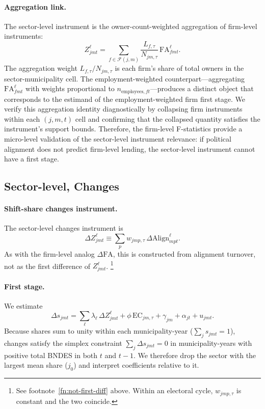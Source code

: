 \documentclass{article}
\newcommand{\Align}{\mathrm{Align}}
\newcommand{\FA}{\mathrm{FA}}
\newcommand{\EC}{\mathrm{EC}}
\begin{document}
\paragraph{Aggregation link.}
The sector-level instrument is the owner-count-weighted aggregation of firm-level instruments:
\[
  Z^{\ell}_{jmt}
  = \sum_{f\in\mathcal{F}(j,m)} \frac{L_{f,\tau}}{N_{jm,\tau}}\,\FA^{\ell}_{fmt}.
\]
The aggregation weight $L_{f,\tau}/N_{jm,\tau}$ is each firm's share of total owners
in the sector-municipality cell.
The employment-weighted counterpart---aggregating $\FA^{\ell}_{fmt}$ with weights
proportional to $n_{\text{employees},ft}$---produces a distinct object that corresponds
to the estimand of the employment-weighted firm first stage.
We verify this aggregation identity diagnostically by collapsing firm instruments
within each $(j,m,t)$ cell and confirming that the collapsed quantity satisfies
the instrument's support bounds.
Therefore, the firm-level F-statistics provide a micro-level validation of the sector-level instrument relevance: if political alignment does not predict firm-level lending, the sector-level instrument cannot have a first stage.

\subsection{Sector-level, Changes}

\paragraph{Shift-share changes instrument.}
The sector-level changes instrument is
\[
  \Delta Z^{\ell}_{jmt} \equiv \sum_{p} w_{jmp,\tau}\,\Delta\Align^{\ell}_{mpt}.
\]
As with the firm-level analog $\Delta\FA$,
this is constructed from alignment turnover, not as the first difference of $Z^{\ell}_{jmt}$.%
\footnote{See footnote~\ref{fn:not-first-diff} above.
Within an electoral cycle, $w_{jmp,\tau}$ is constant and the two coincide.}

\paragraph{First stage.}
We estimate
\[
  \Delta s_{jmt} = \sum_{\ell} \lambda_{\ell}\,\Delta Z^{\ell}_{jmt}
  + \phi\,\EC_{jm,\tau} + \gamma_{jm} + \alpha_{jt} + u_{jmt}.
\]
Because shares sum to unity within each municipality-year
($\sum_j s_{jmt} = 1$), changes satisfy the simplex constraint
$\sum_j \Delta s_{jmt} = 0$ in municipality-years with positive total BNDES
in both $t$ and $t-1$.
We therefore drop the sector with the largest mean share ($j_0$)
and interpret coefficients relative to it.
\end{document}
